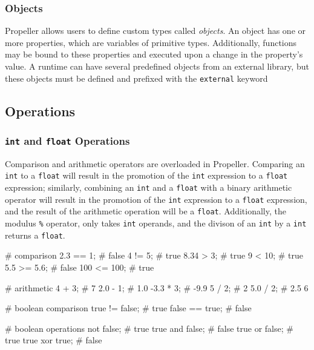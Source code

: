 \subsubsection{Objects}
Propeller allows users to define custom types called \textit{objects}. An object has one or
more properties, which are variables of primitive types. Additionally, functions may be bound
to these properties and executed upon a change in the property's value. A runtime can have
several predefined objects from an external library, but these objects must be defined
and prefixed with the \texttt{external} keyword

\subsection{Operations}


\subsubsection{\texttt{int} and \texttt{float} Operations}
Comparison and arithmetic operators are overloaded in Propeller. Comparing an \texttt{int} to a
\texttt{float} will result in the promotion of the \texttt{int} expression to a \texttt{float} expression;
similarly, combining an \texttt{int} and a \texttt{float} with a binary arithmetic operator will result
in the promotion of the \texttt{int} expression to a \texttt{float} expression, and the result of the
arithmetic operation will be a \texttt{float}. Additionally, the modulus \texttt{\%}
operator, only takes \texttt{int} operands, and the divison of an \texttt{int} by a \texttt{int} returns
a \texttt{float}.

\begin{mylisting}
# comparison
2.3 == 1;   # false
4 != 5;     # true
8.34 > 3;   # true
9 < 10;     # true
5.5 >= 5.6; # false
100 <= 100; # true

# arithmetic
4 + 3;    # 7
2.0 - 1;  # 1.0
-3.3 * 3; # -9.9
5 / 2;    # 2
5.0 / 2;  # 2.5
6 %

# boolean comparison
true != false; # true
false == true; # false

# boolean operations
not false;      # true
true and false; # false
true or false;  # true
true xor true;  # false
\end{mylisting}

